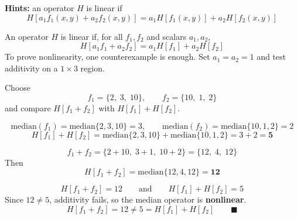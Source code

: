 \documentclass[12pt]{article}
\begin{document}
\textbf{Hints:} an operator $H$ is linear if
\[
H[a_1 f_1(x,y) + a_2 f_2(x,y)] = a_1 H[f_1(x,y)] + a_2 H[f_2(x,y)]
\]

\vspace{0.5cm}

\begin{stepbox}
An operator $H$ is linear if, for all $f_1,f_2$ and scalars $a_1,a_2$,
\[
H[a_1 f_1 + a_2 f_2] = a_1 H[f_1] + a_2 H[f_2]
\]
To prove nonlinearity, one counterexample is enough. Set $a_1=a_2=1$ and test additivity on a $1\times 3$ region.
\end{stepbox}

\begin{stepbox}
Choose
\[
f_1 = \{2,\; 3,\; 10\}, \qquad f_2 = \{10,\; 1,\; 2\}
\]
and compare $H[f_1+f_2]$ with $H[f_1]+H[f_2]$.
\end{stepbox}

\begin{stepbox}
\[
\text{median}(f_1)=\text{median}\{2,3,10\}=3,\qquad
\text{median}(f_2)=\text{median}\{10,1,2\}=2
\]
\[
H[f_1] + H[f_2] = \text{median}\{2,3,10\} + \text{median}\{10,1,2\} = 3 + 2 = \mathbf{5}
\]
\end{stepbox}

\begin{stepbox}
\[
f_1 + f_2 = \{2+10,\; 3+1,\; 10+2\} = \{12,\; 4,\; 12\}
\]
Then
\[
H[f_1 + f_2] = \text{median}\{12, 4, 12\} = \mathbf{12}
\]
\end{stepbox}

\begin{stepbox}
\[
H[f_1 + f_2] = 12 \qquad \text{and} \qquad H[f_1] + H[f_2] = 5
\]
Since $12 \neq 5$, additivity fails, so the median operator is \textbf{nonlinear}.
\[
H[f_1 + f_2] = 12 \neq 5 = H[f_1] + H[f_2] \qquad \blacksquare
\]
\end{stepbox}
\end{document}
